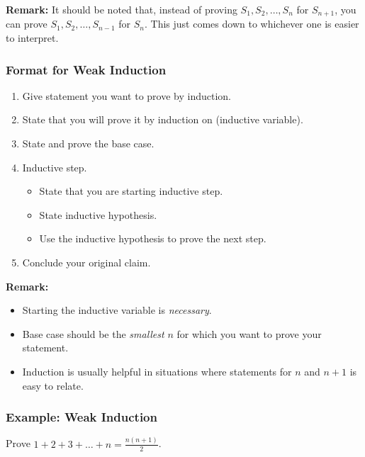 \documentclass[letterpaper]{article}
\begin{document}
\textbf{Remark:} It should be noted that, instead of proving $S_1, S_2, \dots, S_n$ for $S_{n + 1}$, you can prove $S_1, S_2, \dots, S_{n - 1}$ for $S_n$. This just comes down to whichever one is easier to interpret. 

\subsubsection{Format for Weak Induction}
\begin{enumerate}
    \item Give statement you want to prove by induction. 
    \item State that you will prove it by induction on (inductive variable). 
    \item State and prove the base case.
    \item Inductive step.
    \begin{itemize}
        \item State that you are starting inductive step.
        \item State inductive hypothesis. 
        \item Use the inductive hypothesis to prove the next step.
    \end{itemize}
    \item Conclude your original claim. 
\end{enumerate}

\textbf{Remark:}
\begin{itemize}
    \item Starting the inductive variable is \emph{necessary}.
    \item Base case should be the \emph{smallest} $n$ for which you want to prove your statement.
    \item Induction is usually helpful in situations where statements for $n$ and $n + 1$ is easy to relate. 
\end{itemize}

\subsubsection{Example: Weak Induction}
Prove $1 + 2 + 3 + \dots + n = \frac{n(n + 1)}{2}$. 
\end{document}
